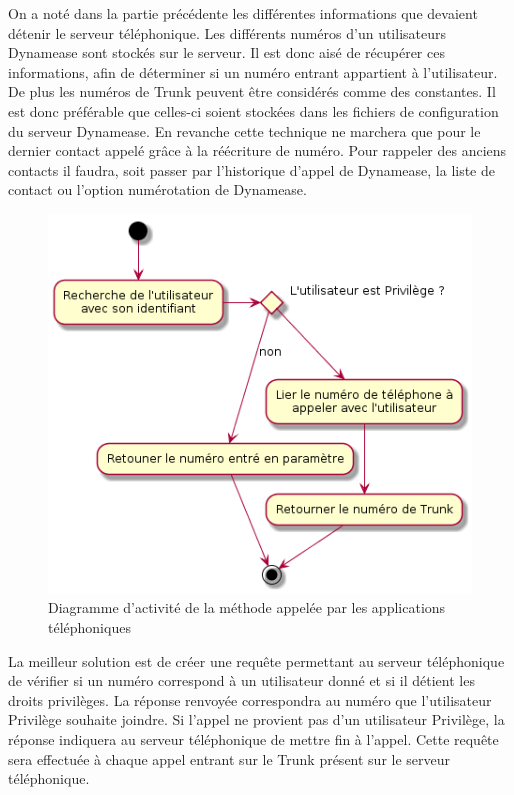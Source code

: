 On a noté dans la partie précédente les différentes informations que devaient détenir le serveur téléphonique. Les différents numéros d'un utilisateurs Dynamease sont stockés sur le serveur. Il est donc aisé de récupérer ces informations, afin de déterminer si un numéro entrant appartient à l'utilisateur. De plus les numéros de Trunk peuvent être considérés comme des constantes. Il est donc préférable que celles-ci soient stockées dans les fichiers de configuration du serveur Dynamease. En revanche cette technique ne marchera que pour le dernier contact appelé grâce à la réécriture de numéro. Pour rappeler des anciens contacts il faudra, soit passer par l'historique d'appel de Dynamease, la liste de contact ou l'option numérotation de Dynamease.
\newpage
\begin{figure}[!h]
	\centering
	\includegraphics[scale=0.7]{img/activity_rewrite_app.png}
	\caption{\label{activity_rewrite_app} Diagramme d'activité de la méthode appelée par les applications téléphoniques}
\end{figure}

La meilleur solution est de créer une requête permettant au serveur téléphonique de vérifier si un numéro correspond à un utilisateur donné et si il détient les droits privilèges. La réponse renvoyée correspondra au numéro que l'utilisateur Privilège souhaite joindre. Si l'appel ne provient pas d'un utilisateur Privilège, la réponse indiquera au serveur téléphonique de mettre fin à l'appel. Cette requête sera effectuée à chaque appel entrant sur le Trunk présent sur le serveur téléphonique.

